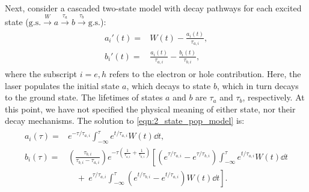 Next, consider a cascaded two-state model with decay pathways for each excited state ($\textrm{g.s.} \xrightarrow{W} a \xrightarrow{\tau_a} b \xrightarrow{\tau_b} \textrm{g.s.}$):
\begin{align}
\label{eqn:2_state_pop_model}
\begin{split}
a_{i}'(t) ={}& W(t) - \frac{a_{i}(t)}{\tau_{a,i}}, \\
b_{i}'(t) ={}& \frac{a_{i}(t)}{\tau_{a,i}} - \frac{b_{i}(t)}{\tau_{b,i}},
\end{split}
\end{align}
where the subscript $i=e,h$ refers to the electron or hole contribution. Here, the laser populates the initial state $a$, which decays to state $b$, which in turn decays to the ground state. The lifetimes of states $a$ and $b$ are $\tau_a$ and $\tau_b$, respectively. At this point, we have not specified the physical meaning of either state, nor their decay mechanisms. The solution to \cref{eqn:2_state_pop_model} is:
\begin{align}
\label{eqn:2_state_pop_sol}
\begin{split}
a_i(\tau) ={}& e^{-\tau/\tau_{a,i}} \int_{-\infty}^{\tau} e^{t/\tau_{a,i}} W(t) \dd{t}, \\
b_i(\tau) ={}& \left( \frac{\tau_{b,i}}{\tau_{b,i} - \tau_{a,i}} \right) e^{-\tau \left(\frac{1}{\tau_{a,i}}+\frac{1}{\tau_{b,i}} \right)} \left[ \left(e^{\tau/\tau_{a,i}}-e^{\tau/\tau_{b,i}}\right) \int_{-\infty}^{\tau} e^{t/\tau_{a,i}} W(t) \dd{t} \right. \\
& \left. \quad + \ e^{\tau/\tau_{a,i}} \int_{-\infty}^{\tau} \left(e^{t/\tau_{b,i}} - e^{t/\tau_{a,i}} \right) W(t) \dd{t}  \right].
\end{split}
\end{align}

